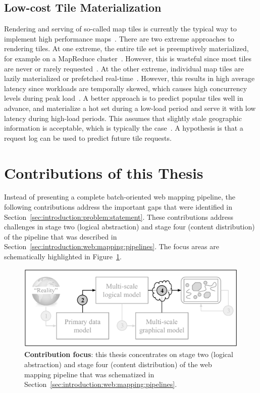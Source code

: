 \documentclass[11pt, oneside]{report}
\begin{document}
{\subsection{Low-cost Tile Materialization}
\label{sec:introduction:problem:statement:four}
Rendering and serving of so-called map tiles is currently the typical way to implement high performance maps~\cite{mbtile12}. There are two extreme approaches to rendering tiles. At one extreme, the entire tile set is preemptively materialized, for example on a MapReduce cluster~\cite{dean2009designs,dean04mapreduce}. However, this is wasteful since most tiles are never or rarely requested~\cite{fisher07hotmap}. At the other extreme, individual map tiles are lazily materialized or prefetched real-time~\cite{kang2001prefetching,kim2001prefetching,lee2001prefetching}. However, this results in high average latency since workloads are temporally skewed, which causes high concurrency levels during peak load~\cite{kefaloukos2012tileheat}. A better approach is to predict popular tiles well in advance, and materialize a hot set during a low-load period and serve it with low latency during high-load periods. This assumes that slightly stale geographic information is acceptable, which is typically the case~\cite{sarma2012fusiontables}. A hypothesis is that a request log can be used to predict future tile requests.

\section{Contributions of this Thesis}
\label{sec:introduction:contributions}

Instead of presenting a complete batch-oriented web mapping pipeline, the following contributions address the important gaps that were identified in Section~\ref{sec:introduction:problem:statement}. These contributions address challenges in stage two (logical abstraction) and stage four (content distribution) of the pipeline that was described in Section~\ref{sec:introduction:web:mapping:pipelines}. The focus areas are schematically highlighted in Figure~\ref{fig:introduction:contributions:highlights}.

\begin{figure}[htbp]
\begin{center}
\includegraphics[scale=.6]{figs-thesis/map-visualization-pipeline-4.pdf}
\caption{\textbf{Contribution focus}: this thesis concentrates on stage two (logical abstraction) and stage four (content distribution) of the web mapping pipeline that was schematized in Section~\ref{sec:introduction:web:mapping:pipelines}.}
\label{fig:introduction:contributions:highlights}
\end{center}
\end{figure}

}
\end{document}
